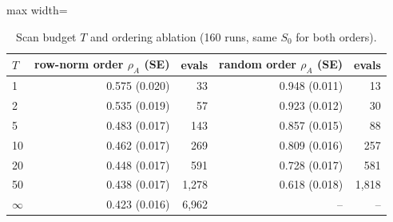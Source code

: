 \begin{table}[t]
\centering\small
\caption{Scan budget $T$ and ordering ablation (160 runs, same $S_0$ for both orders).}\label{tab:tsweep}
\begin{adjustbox}{max width=\linewidth}
\begin{tabular}{lrrrr}
\toprule
$T$ & row-norm order $\rho_A$ (SE) & evals & random order $\rho_A$ (SE) & evals \\
\midrule
1 & 0.575 (0.020) & 33 & 0.948 (0.011) & 13 \\
2 & 0.535 (0.019) & 57 & 0.923 (0.012) & 30 \\
5 & 0.483 (0.017) & 143 & 0.857 (0.015) & 88 \\
10 & 0.462 (0.017) & 269 & 0.809 (0.016) & 257 \\
20 & 0.448 (0.017) & 591 & 0.728 (0.017) & 581 \\
50 & 0.438 (0.017) & 1,278 & 0.618 (0.018) & 1,818 \\
$\infty$ & 0.423 (0.016) & 6,962 & -- & -- \\
\bottomrule
\end{tabular}
\end{adjustbox}
\end{table}
